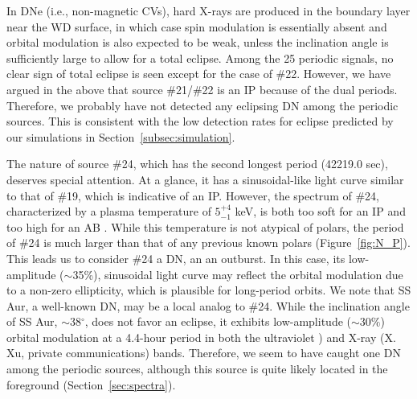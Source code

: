 \documentclass[fleqn,usenatbib]{mnras}
\begin{document}
In DNe (i.e., non-magnetic CVs), hard X-rays are produced in the boundary layer near the WD surface, in which case spin modulation is essentially absent and orbital modulation is also expected to be weak, unless the inclination angle is sufficiently large to allow for a total eclipse. Among the 25 periodic signals, no clear sign of total eclipse is seen except for the case of \#22. However, we have argued in the above that source \#21/\#22 is an IP because of the dual periods. Therefore, we probably have not detected any eclipsing DN among the periodic sources. This is consistent with the low detection rates for eclipse predicted by our simulations in Section~\ref{subsec:simulation}. 

The nature of source \#24, which has the second longest period (42219.0 sec), deserves special attention. At a glance, it has a sinusoidal-like light curve similar to that of \#19, which is indicative of an IP. However, the spectrum of \#24, characterized by a plasma temperature of $5^{+4}_{-1}$ keV, is both too soft for an IP \citep{2016ApJ...818..136X}
and too high for an AB \citep{2004A&ARv..12...71G}. 
While this temperature is not atypical of polars, the period of \#24 is much larger than that of any previous known polars (Figure~\ref{fig:N_P}). 
This leads us to consider \#24 a DN, an an outburst. In this case, its low-amplitude ($\sim$35\%), sinusoidal light curve may reflect the orbital modulation due to a non-zero ellipticity, which is plausible for long-period orbits. 
We note that SS Aur, a well-known DN, may be a local analog to \#24. 
While the inclination angle of SS Aur,  $\sim$38$^\circ$, does not favor an eclipse, it exhibits low-amplitude ($\sim30\%$) orbital modulation at a 4.4-hour period in both the ultraviolet  \citealt{1983ApJ...271..754W,1986Afz....24..227E}) and X-ray (X. Xu, private communications) bands.
Therefore, we seem to have caught one DN among the periodic sources, although this source is quite likely located in the foreground (Section~\ref{sec:spectra}).
\end{document}
